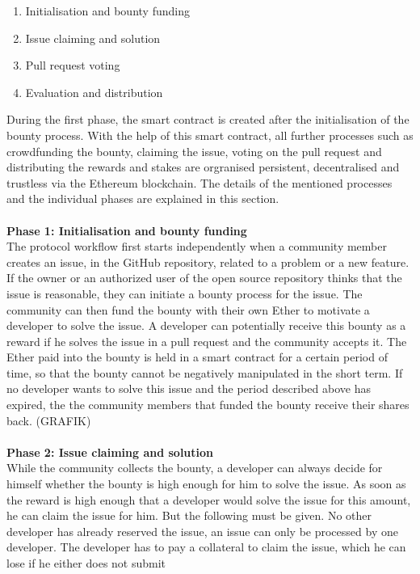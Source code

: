 \documentclass[sigconf]{acmart}
\begin{document}
\begin{enumerate}
  \item Initialisation and bounty funding
  \item Issue claiming and solution
  \item Pull request voting
  \item Evaluation and distribution \\
\end{enumerate}
During the first phase, the smart contract is created after the initialisation of the bounty process. With the help of this smart contract, 
all further processes such as crowdfunding the bounty, claiming the issue, voting on the pull request and distributing the rewards and 
stakes are orgranised persistent, decentralised and trustless via the Ethereum blockchain. The details of the mentioned processes and 
the individual phases are explained in this section. \\ \\
\textbf{Phase 1: Initialisation and bounty funding} \\
The protocol workflow first starts independently when a community member creates an issue, in the GitHub repository, 
related to a problem or a new feature. If the owner or an authorized user of the open source repository thinks that the issue 
is reasonable, they can initiate a bounty process for the issue. The community can then fund the bounty with their own Ether
 to motivate a developer to solve the issue. A developer can potentially receive this bounty as a reward  if he solves the 
issue in a pull request and the community accepts it. The Ether paid into the bounty is held in a smart contract for a certain 
period of time, so that the bounty cannot be negatively manipulated in the short term. If no developer wants to solve this issue
and the period described above has expired, the the community members that funded the bounty receive their shares back.
(GRAFIK) \\ \\
\textbf{Phase 2: Issue claiming and solution} \\
While the community collects the bounty, a developer can always decide for himself whether the bounty is high enough for him to 
solve the issue. As soon as the reward is high enough that a developer would solve the issue for this amount, he can claim the
issue for him. But the following must be given. No other developer has already reserved the issue, an issue can only be processed 
by one developer. The developer has to pay a collateral to claim the issue, which he can lose if he either does not submit 
\end{document}

